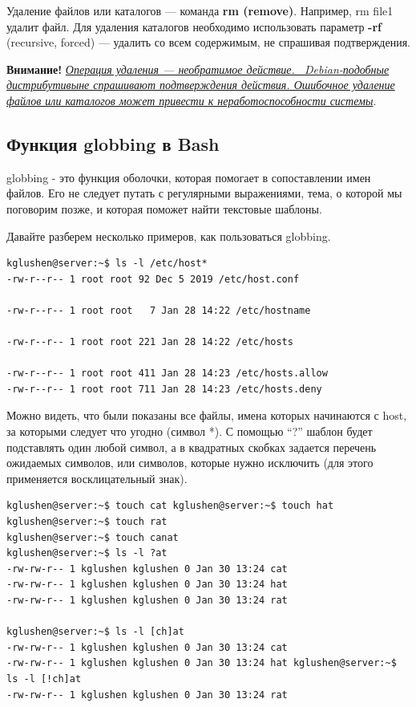 \documentclass[14pt, a4paper]{article}
\begin{document}
Удаление файлов или каталогов — команда \textbf{rm (remove)}. Например, \colorbox{backcolour}{rm file1} удалит файл.
Для удаления каталогов необходимо использовать параметр \textbf{-rf} (recursive, forced) — удалить со всем
содержимым, не спрашивая подтверждения.

\textbf{Внимание!} \textit{\uline{Операция удаления — необратимое действие. \
\linebreak Debian-подобные дистрибутивыне спрашивают подтверждения
\linebreak действия. Ошибочное удаление файлов или каталогов может привести 
к не\-ра\-бо\-то\-способности системы}}.




\subsection*{Функция globbing в Bash}

globbing - это функция оболочки, которая помогает в сопоставлении имен файлов. Его не следует
путать с регулярными выражениями, тема, о которой мы поговорим позже, и которая поможет найти
текстовые шаблоны.

Давайте разберем несколько примеров, как пользоваться globbing.


\begin{lstlisting}
kglushen@server:~$ ls -l /etc/host*
-rw-r--r-- 1 root root 92 Dec 5 2019 /etc/host.conf

-rw-r--r-- 1 root root   7 Jan 28 14:22 /etc/hostname

-rw-r--r-- 1 root root 221 Jan 28 14:22 /etc/hosts

-rw-r--r-- 1 root root 411 Jan 28 14:23 /etc/hosts.allow
-rw-r--r-- 1 root root 711 Jan 28 14:23 /etc/hosts.deny
\end{lstlisting}

Можно видеть, что были показаны все файлы, имена которых начинаются с host, за которыми следует
что угодно (символ *). С помощью “?” шаблон будет подставлять один любой символ, а в квадратных
скобках задается перечень ожидаемых символов, или символов, которые нужно исключить (для этого
применяется восклицательный знак).

\begin{lstlisting}
kglushen@server:~$ touch cat kglushen@server:~$ touch hat kglushen@server:~$ touch rat 
kglushen@server:~$ touch canat
kglushen@server:~$ ls -l ?at
-rw-rw-r-- 1 kglushen kglushen 0 Jan 30 13:24 cat
-rw-rw-r-- 1 kglushen kglushen 0 Jan 30 13:24 hat
-rw-rw-r-- 1 kglushen kglushen 0 Jan 30 13:24 rat 

kglushen@server:~$ ls -l [ch]at
-rw-rw-r-- 1 kglushen kglushen 0 Jan 30 13:24 cat
-rw-rw-r-- 1 kglushen kglushen 0 Jan 30 13:24 hat kglushen@server:~$ ls -l [!ch]at
-rw-rw-r-- 1 kglushen kglushen 0 Jan 30 13:24 rat
\end{lstlisting}
\end{document}

